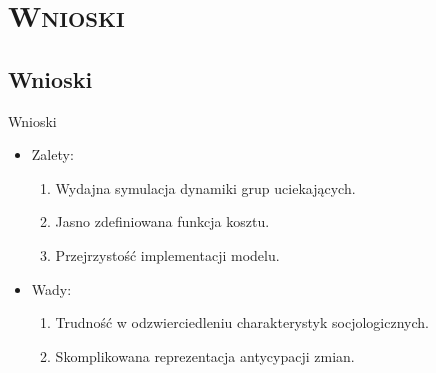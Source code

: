 \section{\scshape Wnioski}

\subsection{Wnioski}
\begin{frame}{Wnioski}
  \begin{itemize}
    \item Zalety:
    \begin{enumerate}
      \item Wydajna symulacja dynamiki grup uciekających.
      \item Jasno zdefiniowana funkcja kosztu.
      \item Przejrzystość implementacji modelu.
    \end{enumerate}
    \item Wady:
    \begin{enumerate}
      \item Trudność w odzwierciedleniu charakterystyk socjologicznych.
      \item Skomplikowana reprezentacja antycypacji zmian.
    \end{enumerate}
  \end{itemize}
\end{frame}